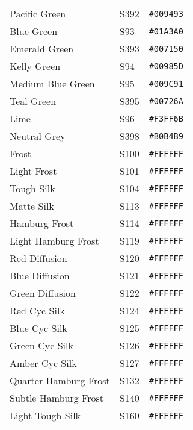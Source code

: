 \documentclass[a4paper]{article}
\begin{document}
\begin{longtable}{|l|l|r|}
Pacific Green & S392 & \texttt{\#009493} \cellcolor[HTML]{009493} \\
Blue Green & S93 & \texttt{\#01A3A0} \cellcolor[HTML]{01A3A0} \\
Emerald Green & S393 & \texttt{\#007150} \cellcolor[HTML]{007150} \\
Kelly Green & S94 & \texttt{\#00985D} \cellcolor[HTML]{00985D} \\
Medium Blue Green & S95 & \texttt{\#009C91} \cellcolor[HTML]{009C91} \\
Teal Green & S395 & \texttt{\#00726A} \cellcolor[HTML]{00726A} \\
Lime & S96 & \texttt{\#F3FF6B} \cellcolor[HTML]{F3FF6B} \\
Neutral Grey & S398 & \texttt{\#B0B4B9} \cellcolor[HTML]{B0B4B9} \\
Frost & S100 & \texttt{\#FFFFFF} \cellcolor[HTML]{FFFFFF} \\
Light Frost & S101 & \texttt{\#FFFFFF} \cellcolor[HTML]{FFFFFF} \\
Tough Silk & S104 & \texttt{\#FFFFFF} \cellcolor[HTML]{FFFFFF} \\
Matte Silk & S113 & \texttt{\#FFFFFF} \cellcolor[HTML]{FFFFFF} \\
Hamburg Frost & S114 & \texttt{\#FFFFFF} \cellcolor[HTML]{FFFFFF} \\
Light Hamburg Frost & S119 & \texttt{\#FFFFFF} \cellcolor[HTML]{FFFFFF} \\
Red Diffusion & S120 & \texttt{\#FFFFFF} \cellcolor[HTML]{FFFFFF} \\
Blue Diffusion & S121 & \texttt{\#FFFFFF} \cellcolor[HTML]{FFFFFF} \\
Green Diffusion & S122 & \texttt{\#FFFFFF} \cellcolor[HTML]{FFFFFF} \\
Red Cyc Silk & S124 & \texttt{\#FFFFFF} \cellcolor[HTML]{FFFFFF} \\
Blue Cyc Silk & S125 & \texttt{\#FFFFFF} \cellcolor[HTML]{FFFFFF} \\
Green Cyc Silk & S126 & \texttt{\#FFFFFF} \cellcolor[HTML]{FFFFFF} \\
Amber Cyc Silk & S127 & \texttt{\#FFFFFF} \cellcolor[HTML]{FFFFFF} \\
Quarter Hamburg Frost & S132 & \texttt{\#FFFFFF} \cellcolor[HTML]{FFFFFF} \\
Subtle Hamburg Frost & S140 & \texttt{\#FFFFFF} \cellcolor[HTML]{FFFFFF} \\
Light Tough Silk & S160 & \texttt{\#FFFFFF} \cellcolor[HTML]{FFFFFF} \\
\hline
\end{longtable}
\end{document}
